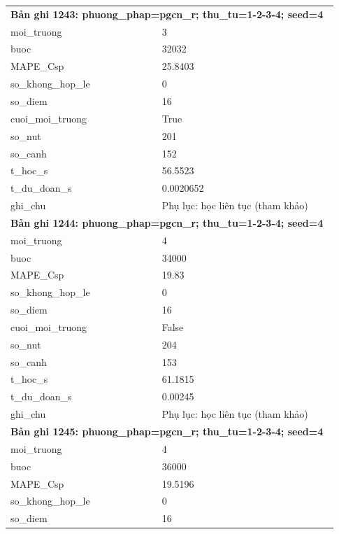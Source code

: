 \begin{longtable}{p{0.43\linewidth}p{0.50\linewidth}}
\midrule
\multicolumn{2}{p{0.95\linewidth}}{\textbf{Bản ghi 1243: phuong\_phap=pgcn\_r; thu\_tu=1-2-3-4; seed=4}} \\
moi\_\allowbreak truong & 3 \\
buoc & 32032 \\
MAPE\_\allowbreak Csp & 25.8403 \\
so\_\allowbreak khong\_\allowbreak hop\_\allowbreak le & 0 \\
so\_\allowbreak diem & 16 \\
cuoi\_\allowbreak moi\_\allowbreak truong & True \\
so\_\allowbreak nut & 201 \\
so\_\allowbreak canh & 152 \\
t\_\allowbreak hoc\_\allowbreak s & 56.5523 \\
t\_\allowbreak du\_\allowbreak doan\_\allowbreak s & 0.0020652 \\
ghi\_\allowbreak chu & Phụ lục: học liên tục (tham khảo) \\
\midrule
\multicolumn{2}{p{0.95\linewidth}}{\textbf{Bản ghi 1244: phuong\_phap=pgcn\_r; thu\_tu=1-2-3-4; seed=4}} \\
moi\_\allowbreak truong & 4 \\
buoc & 34000 \\
MAPE\_\allowbreak Csp & 19.83 \\
so\_\allowbreak khong\_\allowbreak hop\_\allowbreak le & 0 \\
so\_\allowbreak diem & 16 \\
cuoi\_\allowbreak moi\_\allowbreak truong & False \\
so\_\allowbreak nut & 204 \\
so\_\allowbreak canh & 153 \\
t\_\allowbreak hoc\_\allowbreak s & 61.1815 \\
t\_\allowbreak du\_\allowbreak doan\_\allowbreak s & 0.00245 \\
ghi\_\allowbreak chu & Phụ lục: học liên tục (tham khảo) \\
\midrule
\multicolumn{2}{p{0.95\linewidth}}{\textbf{Bản ghi 1245: phuong\_phap=pgcn\_r; thu\_tu=1-2-3-4; seed=4}} \\
moi\_\allowbreak truong & 4 \\
buoc & 36000 \\
MAPE\_\allowbreak Csp & 19.5196 \\
so\_\allowbreak khong\_\allowbreak hop\_\allowbreak le & 0 \\
so\_\allowbreak diem & 16 \\

\end{longtable}
